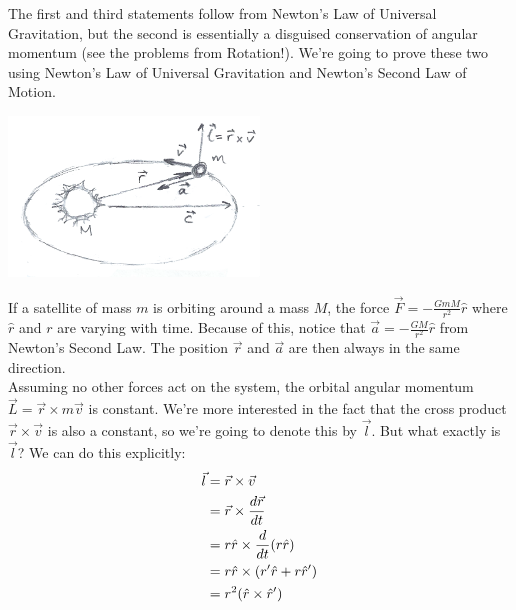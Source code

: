 The first and third statements follow from Newton's Law of Universal Gravitation, but the second is essentially a disguised conservation of angular momentum (see the problems from Rotation!). We're going to prove these two using Newton's Law of Universal Gravitation and Newton's Second Law of Motion. \\
\begin{center}
	\includegraphics[width=0.5\textwidth]{images/mechintro/kepler-1.png}\\
\end{center}
If a satellite of mass $m$ is orbiting around a mass $M$, the force $\vec F = - \frac{GmM}{r^2} \hat r$ where $\hat r$ and $r$ are varying with time. Because of this, notice that $\vec a =  - \frac{GM}{r^2} \hat r$ from Newton's Second Law. The position $\vec r$ and $\vec a$ are then always in the same direction. \\
Assuming no other forces act on the system, the orbital angular momentum $\vec L = \vec r \times m \vec v$ is constant. We're more interested in the fact that the cross product $\vec r \times \vec v$ is also a constant, so we're going to denote this by $\vec l$. But what exactly is $\vec l$? We can do this explicitly:
\begin{align*}
	\vec l &= \vec r \times \vec v \\
	&= \vec r \times \frac{d \vec r}{d t}\\
	&= r \hat r \times \frac{d }{d t}(r \hat r)\\
	&= r \hat r \times (r' \hat r + r \hat r')\\
	&= r^2(\hat r \times \hat r')\\
\end{align*}
